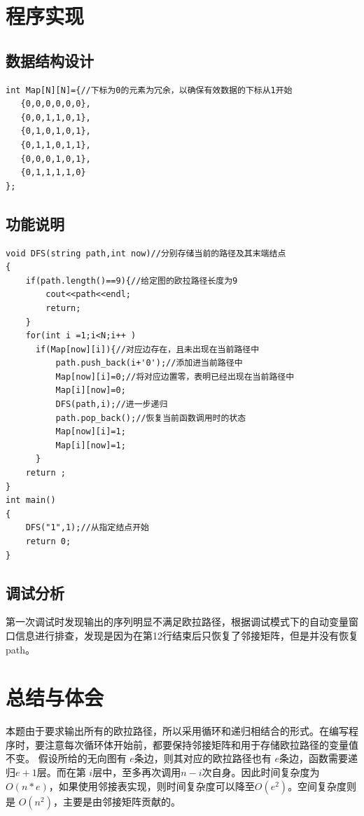 \documentclass[a4paper,11pt]{article}%
\begin{document}
\section{程序实现}
\subsection{数据结构设计}
\begin{lstlisting}[language={[ANSI]C},keywordstyle=\color{blue!70},commentstyle=\color{red!50!green!50!blue!50},frame=shadowbox,
				rulesepcolor=\color{red!20!green!20!blue!20}]
int Map[N][N]={//下标为0的元素为冗余，以确保有效数据的下标从1开始
   {0,0,0,0,0,0},
   {0,0,1,1,0,1},
   {0,1,0,1,0,1},
   {0,1,1,0,1,1},
   {0,0,0,1,0,1},
   {0,1,1,1,1,0}
}; 
\end{lstlisting}
\subsection{功能说明}
\begin{lstlisting}[language={[ANSI]C},keywordstyle=\color{blue!70},commentstyle=\color{red!50!green!50!blue!50},frame=shadowbox,
				rulesepcolor=\color{red!20!green!20!blue!20}]
void DFS(string path,int now)//分别存储当前的路径及其末端结点
{
	if(path.length()==9){//给定图的欧拉路径长度为9
		cout<<path<<endl;
		return;
	}
	for(int i =1;i<N;i++ )	
	  if(Map[now][i]){//对应边存在，且未出现在当前路径中
		  path.push_back(i+'0');//添加进当前路径中
		  Map[now][i]=0;//将对应边置零，表明已经出现在当前路径中
		  Map[i][now]=0;
		  DFS(path,i);//进一步递归
		  path.pop_back();//恢复当前函数调用时的状态
		  Map[now][i]=1;
		  Map[i][now]=1;
	  }
	return ;
}
int main()
{
	DFS("1",1);//从指定结点开始
	return 0;
}
\end{lstlisting}
\subsection{调试分析}
第一次调试时发现输出的序列明显不满足欧拉路径，根据调试模式下的自动变量窗口信息进行排查，发现是因为在第12行结束后只恢复了邻接矩阵，但是并没有恢复
path。
\section{总结与体会}
本题由于要求输出所有的欧拉路径，所以采用循环和递归相结合的形式。在编写程序时，要注意每次循环体开始前，都要保持邻接矩阵和用于存储欧拉路径的变量值不变。
假设所给的无向图有 $e$条边，则其对应的欧拉路径也有 $e$条边，函数需要递归$e+1$层。而在第 $i$层中，至多再次调用$n-i$次自身。因此时间复杂度为
$O(n*e)$，如果使用邻接表实现，则时间复杂度可以降至$O(e^2)$。空间复杂度则是 $O(n^2)$，主要是由邻接矩阵贡献的。
\end{document}
